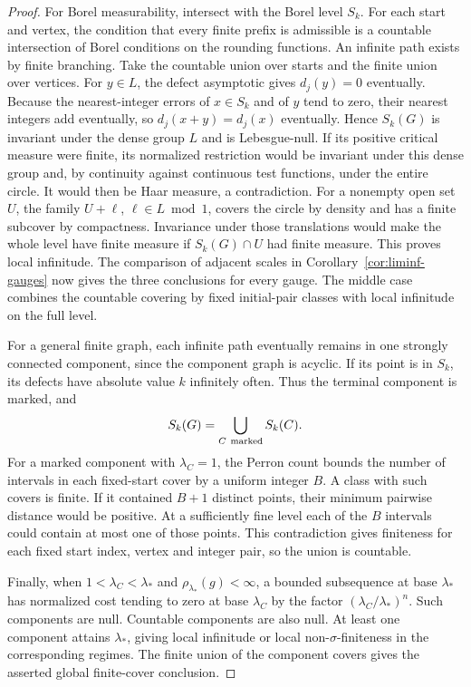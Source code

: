 \documentclass[11pt]{article}
\theoremstyle{definition}
\theoremstyle{remark}
\begin{document}
\begin{proof}
For Borel measurability, intersect with the Borel level $S_k$. For each
start and vertex, the condition that every finite prefix is admissible
is a countable intersection of Borel conditions on the rounding
functions. An infinite path exists by finite branching. Take the
countable union over starts and the finite union over vertices.
For $y\in L$, the defect asymptotic gives $d_j(y)=0$ eventually.
Because the nearest-integer errors of $x\in S_k$ and of $y$ tend to
zero, their nearest integers add eventually, so $d_j(x+y)=d_j(x)$
eventually. Hence $S_k(G)$ is invariant under the dense group $L$
and is Lebesgue-null. If its positive critical measure were finite,
its normalized restriction would be invariant under this dense group
and, by continuity against continuous test functions, under the
entire circle. It would then be Haar measure, a contradiction.
For a nonempty open set $U$, the family $U+\ell$, $\ell\in L\bmod 1$,
covers the circle by density and has a finite subcover by compactness.
Invariance under those translations would make the whole level have
finite measure if $S_k(G)\cap U$ had finite measure. This proves local
infinitude. The comparison of adjacent scales in
Corollary~\ref{cor:liminf-gauges} now gives the three conclusions for
every gauge. The middle case combines the countable covering by
fixed initial-pair classes with local infinitude on the full level.

For a general finite graph, each infinite path eventually remains
in one strongly connected component, since the component graph is
acyclic. If its point is in $S_k$, its defects have absolute value
$k$ infinitely often. Thus the terminal component is marked, and
\[
 S_k(G)=\bigcup_{C\ {\rm marked}} S_k(C).
\]
For a marked component with $\lambda_C=1$, the Perron count bounds the
number of intervals in each fixed-start cover by a uniform integer $B$.
A class with such covers is finite. If it contained $B+1$ distinct points,
their minimum pairwise distance would be positive. At a sufficiently
fine level each of the $B$ intervals could contain at most one of those
points. This contradiction gives finiteness for each fixed start index,
vertex and integer pair, so the union is countable.

Finally, when $1<\lambda_C<\lambda_*$ and
$\rho_{\lambda_*}(g)<\infty$, a bounded subsequence at base $\lambda_*$
has normalized cost tending to zero at base $\lambda_C$ by the
factor $(\lambda_C/\lambda_*)^n$. Such components are null.
Countable components are also null. At least one component attains
$\lambda_*$, giving local infinitude or local non-$\sigma$-finiteness
in the corresponding regimes. The finite union of the component
covers gives the asserted global finite-cover conclusion.
\end{proof}
\end{document}
